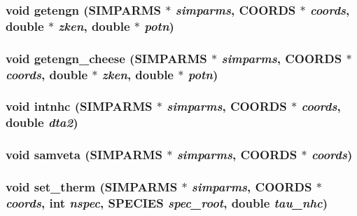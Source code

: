 \subsubsection{\setlength{\rightskip}{0pt plus 5cm}void getengn ({\bf SIMPARMS} $\ast$ {\em simparms}, {\bf COORDS} $\ast$ {\em coords}, double $\ast$ {\em zken}, double $\ast$ {\em potn})}\label{integrate_2md__therm_8c_da3502d7621392f01626bc894cac8368}


\subsubsection{\setlength{\rightskip}{0pt plus 5cm}void getengn\_\-cheese ({\bf SIMPARMS} $\ast$ {\em simparms}, {\bf COORDS} $\ast$ {\em coords}, double $\ast$ {\em zken}, double $\ast$ {\em potn})}\label{integrate_2md__therm_8c_53d83b2112359e7e2d19fcd50a15b99f}


\subsubsection{\setlength{\rightskip}{0pt plus 5cm}void intnhc ({\bf SIMPARMS} $\ast$ {\em simparms}, {\bf COORDS} $\ast$ {\em coords}, double {\em dta2})}\label{integrate_2md__therm_8c_13b91fe3a0c7763d9a122c7de7ce0242}


\subsubsection{\setlength{\rightskip}{0pt plus 5cm}void samveta ({\bf SIMPARMS} $\ast$ {\em simparms}, {\bf COORDS} $\ast$ {\em coords})}\label{integrate_2md__therm_8c_dce71660db00c62c34960b883a2b7422}


\subsubsection{\setlength{\rightskip}{0pt plus 5cm}void set\_\-therm ({\bf SIMPARMS} $\ast$ {\em simparms}, {\bf COORDS} $\ast$ {\em coords}, int {\em nspec}, {\bf SPECIES} {\em spec\_\-root}, double {\em tau\_\-nhc})}\label{integrate_2md__therm_8c_f4c4bc56999c6628aa2bb363b490d32e}


